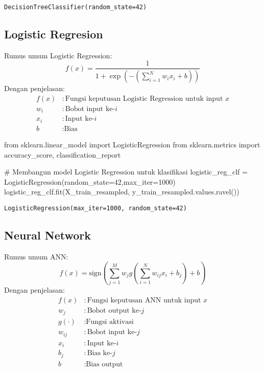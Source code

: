 \documentclass[
  letterpaper,
]{krantz}
\makeatletter
\newenvironment{Shaded}{\begin{snugshade}}{\end{snugshade}}
\newcommand{\CommentTok}[1]{\textcolor[rgb]{0.37,0.37,0.37}{#1}}
\newcommand{\DecValTok}[1]{\textcolor[rgb]{0.68,0.00,0.00}{#1}}
\newcommand{\ImportTok}[1]{\textcolor[rgb]{0.00,0.46,0.62}{#1}}
\newcommand{\NormalTok}[1]{\textcolor[rgb]{0.00,0.23,0.31}{#1}}
\newcommand{\OperatorTok}[1]{\textcolor[rgb]{0.37,0.37,0.37}{#1}}
\newenvironment{kframe}{%
\medskip{}
\setlength{\fboxsep}{.8em}
 \def\at@end@of@kframe{}%
 \ifinner\ifhmode%
  \def\at@end@of@kframe{\end{minipage}}%
  \begin{minipage}{\columnwidth}%
 \fi\fi%
 \def\FrameCommand##1{\hskip\@totalleftmargin \hskip-\fboxsep
 \colorbox{shadecolor}{##1}\hskip-\fboxsep
     \hskip-\linewidth \hskip-\@totalleftmargin \hskip\columnwidth}%
 \MakeFramed {\advance\hsize-\width
   \@totalleftmargin\z@ \linewidth\hsize
   \@setminipage}}%
 {\par\unskip\endMakeFramed%
 \at@end@of@kframe}
\renewenvironment{Shaded}{\begin{kframe}}{\end{kframe}}
\makeatother
\begin{document}
\begin{verbatim}
DecisionTreeClassifier(random_state=42)
\end{verbatim}

\hypertarget{logistic-regresion}{%
\subsection{Logistic Regresion}\label{logistic-regresion}}

Rumus umum Logistic Regression: \[
f(x) = \frac{1}{1 + \exp(-\left(\sum_{i=1}^{N} w_i x_i + b\right))}
\] Dengan penjelasan: \[
\begin{align*}
f(x) & : \text{Fungsi keputusan Logistic Regression untuk input } x \\
w_i & : \text{Bobot input ke-} i \\
x_i & : \text{Input ke-} i \\
b & : \text{Bias}
\end{align*}
\]

\begin{Shaded}
\begin{Highlighting}[]
\ImportTok{from}\NormalTok{ sklearn.linear\_model }\ImportTok{import}\NormalTok{ LogisticRegression}
\ImportTok{from}\NormalTok{ sklearn.metrics }\ImportTok{import}\NormalTok{ accuracy\_score, classification\_report}

\CommentTok{\# Membangun model Logistic Regression untuk klasifikasi}
\NormalTok{logistic\_reg\_clf }\OperatorTok{=}\NormalTok{ LogisticRegression(random\_state}\OperatorTok{=}\DecValTok{42}\NormalTok{,max\_iter}\OperatorTok{=}\DecValTok{1000}\NormalTok{)}
\NormalTok{logistic\_reg\_clf.fit(X\_train\_resampled, y\_train\_resampled.values.ravel())}
\end{Highlighting}
\end{Shaded}

\begin{verbatim}
LogisticRegression(max_iter=1000, random_state=42)
\end{verbatim}

\hypertarget{neural-network}{%
\subsection{Neural Network}\label{neural-network}}

Rumus umum ANN: \[
f(x) = \text{sign}\left(\sum_{j=1}^{M} w_j g\left(\sum_{i=1}^{N} w_{ij} x_i + b_j\right) + b\right)
\] Dengan penjelasan: \[
\begin{align*}
f(x) & : \text{Fungsi keputusan ANN untuk input } x \\
w_j & : \text{Bobot output ke-} j \\
g(\cdot) & : \text{Fungsi aktivasi} \\
w_{ij} & : \text{Bobot input ke-} j \\
x_i & : \text{Input ke-} i \\
b_j & : \text{Bias ke-} j \\
b & : \text{Bias output}
\end{align*}
\]
\end{document}
